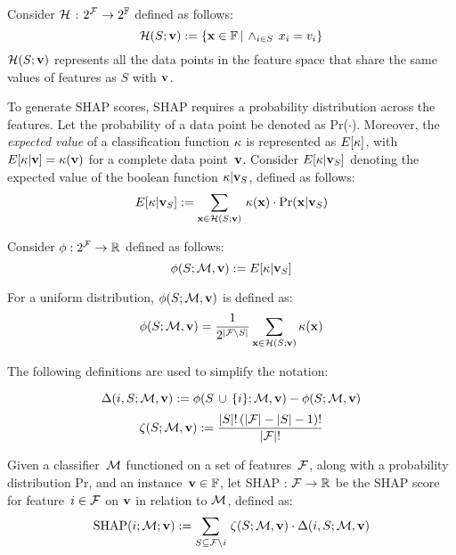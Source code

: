 Consider ${\mathcal{H}}$ : $2^{{\mathcal{F}}} \rightarrow 2^{\mathbb{F}}$ defined as follows:
\begin{equation}
	{\mathcal{H}}(S;\mathbf{v}) := \{ \mathbf{x} \in \mathbb{F}\,|\,\wedge_{i \in S}\,x_i=v_i \}
\end{equation}
${\mathcal{H}}(S;\mathbf{v})$ represents all the data points in the feature 
space that share the same values of features as $S$ with $\mathbf{v}$.

To generate SHAP scores, SHAP requires a probability distribution across the features.
%
Let the probability of a data point be denoted as Pr($\cdot$).
%
Moreover, the \emph{expected value} of a classification function $\kappa$
is represented as $E[\kappa]$, with $E[\kappa | \mathbf{v}] = \kappa(\mathbf{v})$
for a complete data point~$\mathbf{v}$. 
%
Consider $E[\kappa | \mathbf{v}_{S}]$ denoting the expected value of the boolean function $\kappa
| \mathbf{v}_S$, defined as follows:
\begin{equation}
	E[\kappa | \mathbf{v}_{S}] := \sum\limits_{\mathbf{x} \in {\mathcal{H}}(S;\mathbf{v})}\,\kappa(\mathbf{x})
	\cdot \text{Pr}(\mathbf{x} | \mathbf{v}_S)
\end{equation}

Consider $\phi: 2^{{\mathcal{F}}} \rightarrow \mathbb{R}$ defined as follows:
\begin{equation}
	\phi(S; {\mathcal{M}}, \mathbf{v}) := E[\kappa | \mathbf{v}_{S}]
\end{equation}

For a uniform distribution, $\phi(S; {\mathcal{M}}, \mathbf{v})$ is defined as:
\begin{equation}
		\phi(S; {\mathcal{M}}, \mathbf{v}) = \frac{1}{2^{|{\mathcal{F}} \setminus S|}} \sum\limits_{\mathbf{x}
		\in {\mathcal{H}}(S;\mathbf{v})} \kappa(\mathbf{x})
\end{equation}

The following definitions are used to simplify the notation:

\begin{equation}
	\Delta(i, S; {\mathcal{M}}, \mathbf{v}) := \phi(S\,\cup\,\{i\}; {\mathcal{M}}, \mathbf{v}) - \phi(S; {\mathcal{M}},
	\mathbf{v})
\end{equation}
\begin{equation}
	\zeta(S; {\mathcal{M}}, \mathbf{v}) := \frac{|S|!\,(|{\mathcal{F}}| - |S| - 1)!}{|{\mathcal{F}}|!}
\end{equation}

\begin{definition}\label{def:shap}
	Given a classifier~${\mathcal{M}}$ functioned on a set of features~${\mathcal{F}}$, along
	with a probability distribution Pr, and an instance~$\mathbf{v} \in \mathbb{F}$,
	let SHAP : ${\mathcal{F}} \rightarrow \mathbb{R}$ be the SHAP score for feature~$i \in {\mathcal{F}}$ on
	$\mathbf{v}$ in relation to ${\mathcal{M}}$,
	defined as:
	\begin{equation}
		\text{SHAP}(i; {\mathcal{M}}; \mathbf{v}) := \sum\limits_{S \subseteq {\mathcal{F}} \setminus
		i}\,\zeta(S;{\mathcal{M}},
		\mathbf{v}) \cdot \Delta(i, S; {\mathcal{M}}, \mathbf{v})
	\end{equation}
\end{definition}

